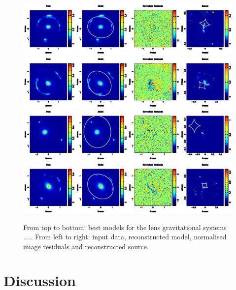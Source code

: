 \documentclass[a4paper,fleqn,usenatbib]{mnras}
\begin{document}
 \begin{figure}
\begin{center} 
\includegraphics[width = 16 cm]{fig1m.ps}
\includegraphics[width = 16 cm]{fig1o.ps}
\includegraphics[width = 16 cm]{fig1r.ps}
\includegraphics[width = 16 cm]{fig1s.ps}
\caption{From top to bottom: best models for the lens gravitational systems ..... From left to right: input data, reconstructed model, normalised image residuals and reconstructed source.}
\label{fig:J0252_smooth}
\end{center}     
 \end{figure}



\section{Discussion}
\end{document}
